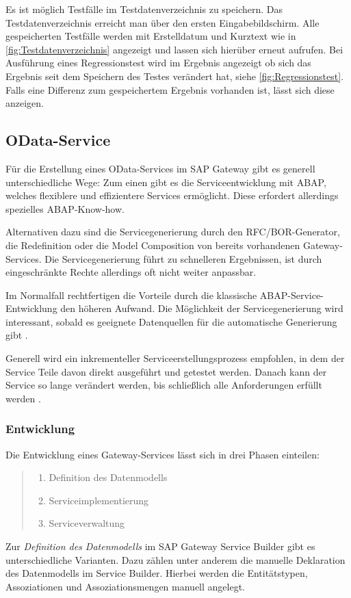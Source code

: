 Es ist möglich Testfälle im Testdatenverzeichnis zu speichern. Das Testdatenverzeichnis erreicht man über den ersten Eingabebildschirm. Alle gespeicherten Testfälle werden mit Erstelldatum und Kurztext wie in \autoref{fig:Testdatenverzeichnis} angezeigt und lassen sich hierüber erneut aufrufen. Bei Ausführung eines  Regressionstest wird im Ergebnis angezeigt ob sich das Ergebnis seit dem Speichern des Testes verändert hat, siehe \autoref{fig:Regressionstest}. Falls eine Differenz zum gespeichertem Ergebnis vorhanden ist, lässt sich diese anzeigen.\\ 



\subsection{OData-Service}
Für die Erstellung eines OData-Services im SAP Gateway gibt es generell unterschiedliche Wege: Zum einen gibt es die Serviceentwicklung mit \ac{ABAP}, welches flexiblere und effizientere Services ermöglicht. Diese erfordert allerdings spezielles \ac{ABAP}-Know-how. 

Alternativen dazu sind die Servicegenerierung durch den \ac{RFC}/\ac{BOR}-Generator, die Redefinition oder die Model Composition von bereits vorhandenen Gateway-Services. Die Servicegenerierung führt zu schnelleren Ergebnissen, ist durch eingeschränkte Rechte allerdings oft nicht weiter anpassbar.

Im Normalfall rechtfertigen die Vorteile durch die klassische ABAP-Service-Entwicklung den höheren Aufwand. Die Möglichkeit der Servicegenerierung wird interessant, sobald es geeignete Datenquellen für die automatische Generierung gibt \cite[S.\ 181]{BoennenDreesFischerHeinzStrothmann2014}.

Generell wird ein inkrementeller Serviceerstellungsprozess empfohlen, in dem der Service \bzw Teile davon direkt ausgeführt und getestet werden. Danach kann der Service so lange verändert werden, bis schließlich alle Anforderungen erfüllt werden \cite[S.\ 184]{BoennenDreesFischerHeinzStrothmann2014}.


\subsubsection{Entwicklung}
Die Entwicklung eines Gateway-Services lässt sich in drei Phasen einteilen:

\begin{quote}
	\begin{enumerate}
		\item Definition des Datenmodells
		\item Serviceimplementierung
		\item Serviceverwaltung
	\end{enumerate}
\end{quote}
Zur \textit{Definition des Datenmodells} im SAP Gateway Service Builder gibt es unterschiedliche Varianten. 
Dazu zählen unter anderem die manuelle Deklaration des Datenmodells im Service Builder. Hierbei werden die Entitätstypen, Assoziationen und Assoziationsmengen manuell angelegt.

